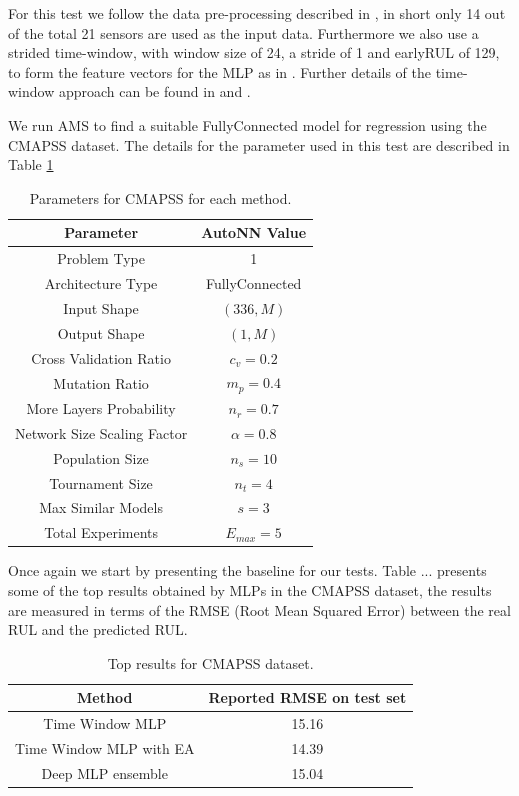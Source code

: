 \documentclass[journal]{IEEEtran}
\begin{document}
For this test we follow the data pre-processing described in \cite{Laredo2018}, in short only 14 out of the total 21 sensors are used as the input data. Furthermore we also use a strided time-window, with window size of 24, a stride of 1 and earlyRUL of 129, to form the feature vectors for the MLP as in \cite{Laredo2018}. Further details of the time-window approach can be found in \cite{Laredo2018} and \cite{Li2018}.

We run AMS to find a suitable FullyConnected model for regression using the CMAPSS dataset. The details for the parameter used in this test are described in Table \ref{table:CMAPSS_params}

\begin{table}[!htb]
\begin{center}
\begin{tabular}{| c | c |}
\hline
Parameter & AutoNN Value \\
\hline
Problem Type & 1 \\
Architecture Type & FullyConnected \\
Input Shape & $(336, M)$  \\
Output Shape & $(1, M)$ \\
Cross Validation Ratio & $c_v = 0.2$ \\
Mutation Ratio & $m_p = 0.4$ \\
More Layers Probability & $n_r = 0.7$ \\
Network Size Scaling Factor & $\alpha = 0.8$ \\
Population Size & $n_s = 10$ \\
Tournament Size & $n_t = 4$ \\
Max Similar Models & $s = 3$ \\
Total Experiments & $E_{max} = 5$ \\
\hline
\end{tabular}
\end{center}
\caption{Parameters for CMAPSS for each method.}
\label{table:CMAPSS_params}
\end{table}

Once again we start by presenting the baseline for our tests. Table ... presents some of the top results obtained by MLPs in the CMAPSS dataset, the results are measured in terms of the RMSE (Root Mean Squared Error) between the real RUL and the predicted RUL.

\begin{table}[!htb]
\begin{center}
\begin{tabular}{| c | c |}
\hline
Method & Reported RMSE on test set \\
\hline
Time Window MLP & 15.16 \\
Time Window MLP with EA & 14.39 \\
Deep MLP ensemble & 15.04 \\
\hline
\end{tabular}
\end{center}
\caption{Top results for CMAPSS dataset.}
\label{table:CMAPSS_results_top}
\end{table}
\end{document}
